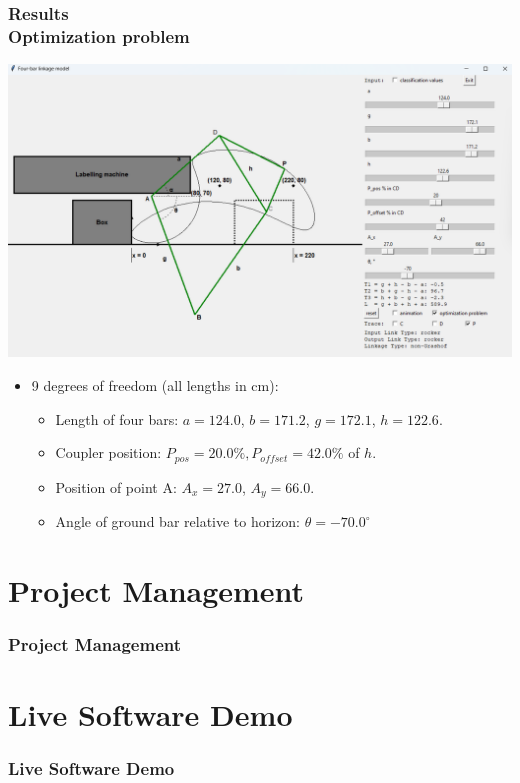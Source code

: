 \documentclass[ucs,10pt]{beamer}
\begin{document}
\begin{frame}
\frametitle{Results \\
	\small \color{rwth-blue} Optimization problem}
	\begin{center}
		\includegraphics[width=0.8\linewidth]{./Figures/optimization_problem_solution.png}
	\end{center}
	\begin{itemize}
		\item 9 degrees of freedom (all lengths in cm):
		\begin{itemize}
			\item Length of four bars: $a = 124.0$, $b = 171.2$, $g = 172.1$, $h = 122.6$.
			\item Coupler position: $P_{pos} = 20.0 \%, P_{offset} = 42.0 \%$ of $h$.
			\item Position of point A: $A_x = 27.0$, $A_y = 66.0$.
			\item Angle of ground bar relative to horizon: $\theta = -70.0^{\circ}$
		\end{itemize}
	\end{itemize}
\end{frame}

\section{Project Management}

\begin{frame}
\frametitle{Project Management}
\end{frame}

\section{Live Software Demo}

\begin{frame}
\frametitle{Live Software Demo} 
\end{frame}
\end{document}
